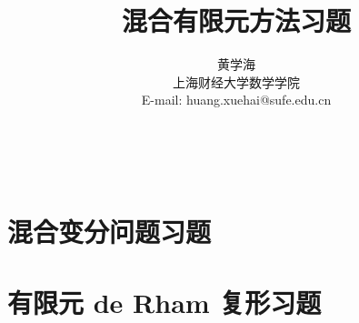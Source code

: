 \documentclass[11pt]{book}
\begin{document}
\newenvironment{zenumerate}{\newcounter{zitem}\setcounter{zitem}{0}}{}
\newcommand\zitem{\refstepcounter{zitem}(\thezitem) }

\newenvironment{xenumerate}[1][]
{\enumerate[(1)]}{\endenumerate}




\title{混合有限元方法习题}
\author{黄学海  \\{\small 上海财经大学数学学院}
\\{\small E-mail: huang.xuehai@sufe.edu.cn }
\\
\\
\\
\\
 }

\date{}
\vskip 0.5cm
\maketitle


\cleardoublepage
\renewcommand\contentsname{目录}
\tableofcontents







% 


\chapter{混合变分问题习题}

\cleardoublepage


\chapter{有限元 de Rham 复形习题}

\cleardoublepage


% 





{}


\cleardoublepage
\end{document}
